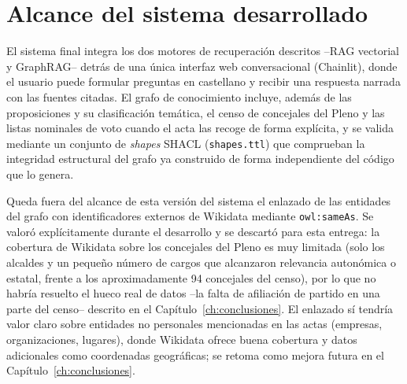 \section{Alcance del sistema desarrollado}

El sistema final integra los dos motores de recuperación descritos --RAG
vectorial y GraphRAG-- detrás de una única interfaz web conversacional
(Chainlit), donde el usuario puede formular preguntas en castellano y recibir una
respuesta narrada con las fuentes citadas. El grafo de conocimiento incluye,
además de las proposiciones y su clasificación temática, el censo de concejales
del Pleno y las listas nominales de voto cuando el acta las recoge de forma
explícita, y se valida mediante un conjunto de \textit{shapes} SHACL
(\texttt{shapes.ttl}) que comprueban la integridad estructural del grafo ya
construido de forma independiente del código que lo genera.

Queda fuera del alcance de esta versión del sistema el enlazado de las
entidades del grafo con identificadores externos de Wikidata mediante
\texttt{owl:sameAs}. Se valoró explícitamente durante el desarrollo y se
descartó para esta entrega: la cobertura de Wikidata sobre los concejales del
Pleno es muy limitada (solo los alcaldes y un pequeño número de cargos que
alcanzaron relevancia autonómica o estatal, frente a los aproximadamente 94
concejales del censo), por lo que no habría resuelto el hueco real de datos
--la falta de afiliación de partido en una parte del censo-- descrito en el
Capítulo~\ref{ch:conclusiones}. El enlazado sí tendría valor claro sobre
entidades no personales mencionadas en las actas (empresas, organizaciones,
lugares), donde Wikidata ofrece buena cobertura y datos adicionales como
coordenadas geográficas; se retoma como mejora futura en el
Capítulo~\ref{ch:conclusiones}.
